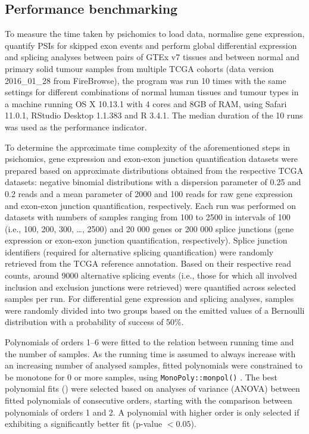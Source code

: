 \subsection{Performance benchmarking}

To measure the time taken by psichomics to load data, normalise gene expression, quantify PSIs for skipped exon events and perform global differential expression and splicing analyses between pairs of GTEx v7 tissues and between normal and primary solid tumour samples from multiple TCGA cohorts (data version 2016\_01\_28 from FireBrowse), the program was run 10 times with the same settings for different combinations of normal human tissues and tumour types in a machine running OS X 10.13.1 with 4 cores and 8GB of RAM, using Safari 11.0.1, RStudio Desktop 1.1.383 and R 3.4.1. The median duration of the 10 runs was used as the performance indicator.

To determine the approximate time complexity of the aforementioned steps in psichomics, gene expression and exon-exon junction quantification datasets were prepared based on approximate distributions obtained from the respective TCGA datasets: negative binomial distributions with a dispersion parameter of 0.25 and 0.2 reads and a mean parameter of 2000 and 100 reads for raw gene expression and exon-exon junction quantification, respectively. Each run was performed on datasets with numbers of samples ranging from 100 to 2500 in intervals of 100 (i.e., 100, 200, 300, …, 2500) and 20 000 genes or 200 000 splice junctions (gene expression or exon-exon junction quantification, respectively). Splice junction identifiers (required for alternative splicing quantification) were randomly retrieved from the TCGA reference annotation. Based on their respective read counts, around 9000 alternative splicing events (i.e., those for which all involved inclusion and exclusion junctions were retrieved) were quantified across selected samples per run. For differential gene expression and splicing analyses, samples were randomly divided into two groups based on the emitted values of a Bernoulli distribution with a probability of success of 50\%.

Polynomials of orders 1–6 were fitted to the relation between running time and the number of samples. As the running time is assumed to always increase with an increasing number of analysed samples, fitted polynomials were constrained to be monotone for 0 or more samples, using \texttt{MonoPoly::monpol()} \cite{murray:2016um}. The best polynomial fits () were selected based on analyses of variance (ANOVA) between fitted polynomials of consecutive orders, starting with the comparison between polynomials of orders 1 and 2. A polynomial with higher order is only selected if exhibiting a significantly better fit (p-value $< 0.05$).

